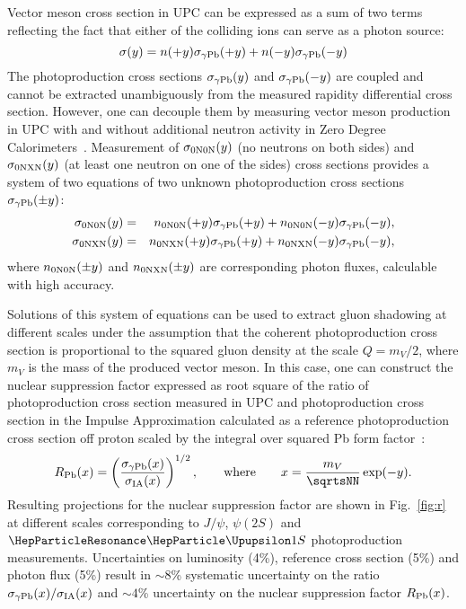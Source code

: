 \documentclass[../report.tex]{subfiles}
\begin{document}
Vector meson cross section in \PbPb UPC can be expressed as a sum of two terms reflecting the fact that either of the colliding ions can serve as a photon source:
\begin{equation}
\sigma(y) = n(+y) \sigma_{\rm \gamma Pb}(+y) + n(-y) \sigma_{\rm \gamma Pb}(-y)
\end{equation}
The photoproduction cross sections $\sigma_{\rm \gamma Pb}(y)$ and $\sigma_{\rm \gamma Pb}(-y)$ are coupled and cannot be extracted unambiguously from the measured rapidity differential cross section. However, one can decouple them by measuring vector meson production in UPC with and without additional neutron activity in Zero Degree Calorimeters~\cite{Guzey:2013jaa}. Measurement of $\sigma_{\rm 0N0N}(y)$ (no neutrons on both sides) and $\sigma_{\rm 0NXN}(y)$ (at least one neutron on one of the sides) cross sections provides a system of two equations of two unknown photoproduction cross sections $\sigma_{\rm \gamma Pb}(\pm y)$:
\begin{eqnarray}
\sigma_{\rm 0N0N}(y) &=& n_{\rm 0N0N}(+y) \sigma_{\rm \gamma Pb}(+y) + n_{\rm 0N0N}(-y) \sigma_{\rm \gamma Pb}(-y), \\
\sigma_{\rm 0NXN}(y) &=& n_{\rm 0NXN}(+y) \sigma_{\rm \gamma Pb}(+y) + n_{\rm 0NXN}(-y) \sigma_{\rm \gamma Pb}(-y),
\end{eqnarray}
where $n_{\rm 0N0N}(\pm y)$ and $n_{\rm 0NXN}(\pm y)$ are corresponding photon fluxes, calculable with high accuracy.

Solutions of this system of equations can be used to extract gluon shadowing at different scales under the assumption that the coherent photoproduction cross section is proportional to the squared gluon density at the scale $Q = m_{V}/2$, where $m_V$ is the mass of the produced vector meson. In this case, one can construct the nuclear suppression factor expressed as root square of the ratio of photoproduction cross section measured in \PbPb UPC and photoproduction cross section in the Impulse Approximation calculated as a reference photoproduction cross section off proton scaled by the integral over squared Pb form factor~\cite{Guzey:2013xba}:
\begin{equation}
R_{\rm Pb} (x) = \left(\frac{\sigma_{\rm \gamma Pb}(x)}{\sigma_{\rm IA}(x)}\right)^{1/2}, \qquad {\rm where}\qquad x  = \frac{m_{V}}{\sqrtsNN}\exp(-y).
\end{equation}
Resulting projections for the nuclear suppression factor are shown in Fig.~\ref{fig:r} at different scales corresponding to $J/\psi$, $\psi(2S)$ and $\PGUP{1S}$ photoproduction measurements. Uncertainties on luminosity (4\%), reference cross section (5\%) and photon flux (5\%) result in $\sim8$\% systematic uncertainty on the ratio $\sigma_{\rm \gamma Pb}(x)/\sigma_{\rm IA}(x)$ and $\sim 4$\% uncertainty on the nuclear suppression factor $R_{\rm Pb} (x)$.
\end{document}
